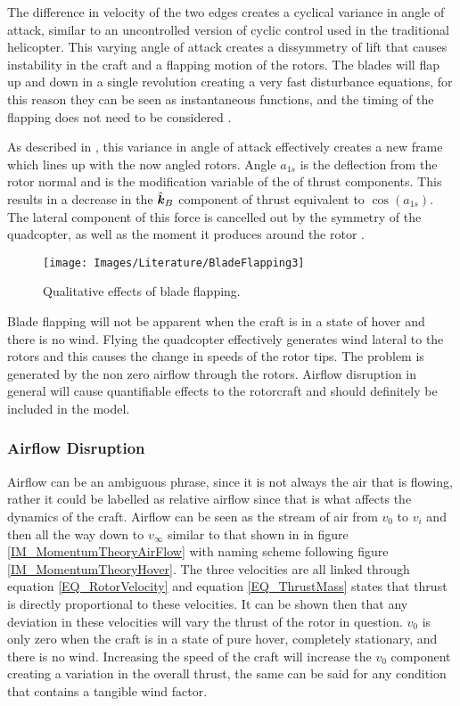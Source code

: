 		The difference in velocity of the two edges creates a cyclical variance in angle of attack, similar to an uncontrolled version of cyclic control used in the traditional helicopter. This varying angle of attack creates a dissymmetry of lift that causes instability in the craft and a flapping motion of the rotors. The blades will flap up and down in a single revolution creating a very fast disturbance equations, for this reason they can be seen as instantaneous functions, and the timing of the flapping does not need to be considered \cite{Pounds2006}.
		
		As described in \cite{Hoffmann, Pounds2006}, this variance in angle of attack effectively creates a new frame which lines up with the now angled rotors. Angle $a_{1s}$ is the deflection from the rotor normal and is the modification variable of the of thrust components. This results in a decrease in the $\hat{\textbf{\textit{k}}}_B$ component of thrust equivalent to $\cos (a_{1s})$. The lateral component of this force is cancelled out by the symmetry of the quadcopter, as well as the moment it produces around the rotor \cite{Hoffmann}.
		
		\begin{figure}[H]
			\centering
			\texttt{[image: Images/Literature/BladeFlapping3]}     
			\caption{Qualitative effects of blade flapping.}
			\label{IM_BladeFlapping}
		\end{figure}
		
		Blade flapping will not be apparent when the craft is in a state of hover and there is no wind. Flying the quadcopter effectively generates wind lateral to the rotors and this causes the change in speeds of the rotor tips. The problem is generated by the non zero airflow through the rotors. Airflow disruption in general will cause quantifiable effects to the rotorcraft and should definitely be included in the model.
		
		\subsubsection{Airflow Disruption}
		Airflow can be an ambiguous phrase, since it is not always the air that is flowing, rather it could be labelled as relative airflow since that is what affects the dynamics of the craft. Airflow can be seen as the stream of air from $v_0$ to $v_i$ and then all the way down to $v_\infty$ similar to that shown in in figure \ref{IM_MomentumTheoryAirFlow} with naming scheme following figure \ref{IM_MomentumTheoryHover}. The three velocities are all linked through equation \ref{EQ_RotorVelocity} and equation \ref{EQ_ThrustMass} states that thrust is directly proportional to these velocities. It can be shown then that any deviation in these velocities will vary the thrust of the rotor in question. $v_0$ is only zero when the craft is in a state of pure hover, completely stationary, and there is no wind. Increasing the speed of the craft will increase the $v_0$ component creating a variation in the overall thrust, the same can be said for any condition that contains a tangible wind factor. 
		
